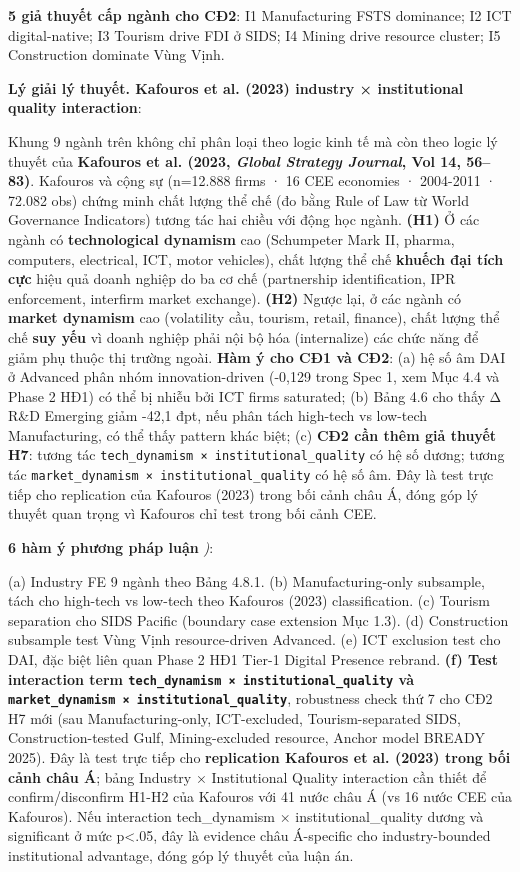 \documentclass[12pt,a4paper]{article}
\begin{document}
\textbf{5 giả thuyết cấp ngành cho CĐ2}: I1 Manufacturing FSTS
dominance; I2 ICT digital-native; I3 Tourism drive FDI ở SIDS; I4 Mining
drive resource cluster; I5 Construction dominate Vùng Vịnh.

\textbf{Lý giải lý thuyết. Kafouros et al. (2023) industry ×
institutional quality interaction}:

Khung 9 ngành trên không chỉ phân loại theo logic kinh tế mà còn theo
logic lý thuyết của \textbf{Kafouros et al. (2023, \emph{Global Strategy
Journal}, Vol 14, 56--83)}. Kafouros và cộng sự (n=12.888 firms · 16 CEE
economies · 2004-2011 · 72.082 obs) chứng minh chất lượng thể chế (đo
bằng Rule of Law từ World Governance Indicators) tương tác hai chiều với
động học ngành. \textbf{(H1)} Ở các ngành có \textbf{technological
dynamism} cao (Schumpeter Mark II, pharma, computers, electrical, ICT,
motor vehicles), chất lượng thể chế \textbf{khuếch đại tích cực} hiệu
quả doanh nghiệp do ba cơ chế (partnership identification, IPR
enforcement, interfirm market exchange). \textbf{(H2)} Ngược lại, ở các
ngành có \textbf{market dynamism} cao (volatility cầu, tourism, retail,
finance), chất lượng thể chế \textbf{suy yếu} vì doanh nghiệp phải nội
bộ hóa (internalize) các chức năng để giảm phụ thuộc thị trường ngoài.
\textbf{Hàm ý cho CĐ1 và CĐ2}: (a) hệ số âm DAI ở Advanced phân nhóm
innovation-driven (-0,129 trong Spec 1, xem Mục 4.4 và Phase 2 HĐ1) có
thể bị nhiễu bởi ICT firms saturated; (b) Bảng 4.6 cho thấy Δ R\&D
Emerging giảm -42,1 đpt, nếu phân tách high-tech vs low-tech
Manufacturing, có thể thấy pattern khác biệt; (c) \textbf{CĐ2 cần thêm
giả thuyết H7}: tương tác
\texttt{tech\_dynamism\ ×\ institutional\_quality} có hệ số dương; tương
tác \texttt{market\_dynamism\ ×\ institutional\_quality} có hệ số âm.
Đây là test trực tiếp cho replication của Kafouros (2023) trong bối cảnh
châu Á, đóng góp lý thuyết quan trọng vì Kafouros chỉ test trong bối
cảnh CEE.

\textbf{6 hàm ý phương pháp luận} \emph{)}:

(a) Industry FE 9 ngành theo Bảng 4.8.1. (b) Manufacturing-only
subsample, tách cho high-tech vs low-tech theo Kafouros (2023)
classification. (c) Tourism separation cho SIDS Pacific (boundary case
extension Mục 1.3). (d) Construction subsample test Vùng Vịnh
resource-driven Advanced. (e) ICT exclusion test cho DAI, đặc biệt liên
quan Phase 2 HĐ1 Tier-1 Digital Presence rebrand. \textbf{(f) Test
interaction term \texttt{tech\_dynamism\ ×\ institutional\_quality} và
\texttt{market\_dynamism\ ×\ institutional\_quality}}, robustness check
thứ 7 cho CĐ2 H7 mới (sau Manufacturing-only, ICT-excluded,
Tourism-separated SIDS, Construction-tested Gulf, Mining-excluded
resource, Anchor model BREADY 2025). Đây là test trực tiếp cho
\textbf{replication Kafouros et al. (2023) trong bối cảnh châu Á}; bảng
Industry × Institutional Quality interaction cần thiết để
confirm/disconfirm H1-H2 của Kafouros với 41 nước châu Á (vs 16 nước CEE
của Kafouros). Nếu interaction tech\_dynamism × institutional\_quality
dương và significant ở mức p\textless.05, đây là evidence châu
Á-specific cho industry-bounded institutional advantage, đóng góp lý
thuyết của luận án.
\end{document}
